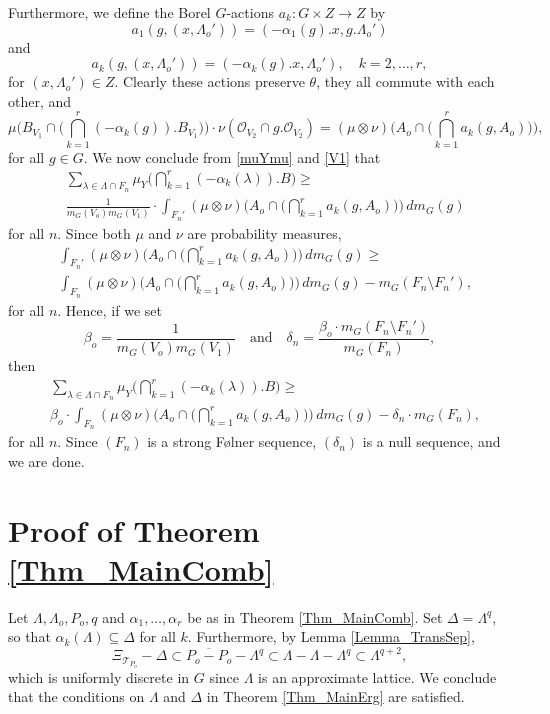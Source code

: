 \documentclass[12pt,reqno,a4paper]{amsart}
\numberwithin{equation}{section}
\newcommand{\cO}{\mathcal{O}}
\newcommand{\cT}{\mathcal{T}}
\newcommand{\ra}{\rightarrow}
\newcommand{\qand}{\quad \textrm{and} \quad}
\theoremstyle{theorem}
\theoremstyle{task}
\theoremstyle{definition}
\begin{document}
\noindent Furthermore, we define the Borel $G$-actions $a_k : G \times Z \ra Z$ by
\[
a_1(g,(x,\Lambda_o')) = (-\alpha_1(g).x,g.\Lambda_o') 
\]
and
\[
a_k(g,(x,\Lambda_o')) = (-\alpha_k(g).x,\Lambda_o'), \quad k = 2,\ldots,r,
\]
for $(x,\Lambda_o') \in Z$. 
Clearly these actions preserve $\theta$, they all commute with each other, and
\[
\mu\Big(B_{V_1} \cap \Big( \bigcap_{k=1}^r (-\alpha_k(g)).B_{V_1}\Big)\Big) \cdot \nu(\cO_{V_2} \cap g.\cO_{V_2})
= (\mu \otimes \nu)\Big( A_o \cap \Big( \bigcap_{k=1}^r a_k(g,A_o) \Big)\Big),
\]
for all $g \in G$. We now conclude from \eqref{muYmu} and \eqref{V1} that
\begin{align*}
&\sum_{\lambda \in \Lambda \cap F_n} \mu_Y\Big( \bigcap_{k=1}^r (-\alpha_k(\lambda)).B\Big)
\geq \\[0.2cm]
&\frac{1}{m_G(V_o)m_G(V_1)} \cdot \int_{F_n'} (\mu \otimes \nu)\Big( A_o \cap \Big( \bigcap_{k=1}^r a_k(g,A_o) \Big)\Big) \, dm_G(g)
\end{align*}
for all $n$. Since both $\mu$ and $\nu$ are probability measures, 
\begin{align*}
&\int_{F_n'} (\mu \otimes \nu)\Big( A_o \cap \Big( \bigcap_{k=1}^r a_k(g,A_o) \Big)\Big) \, dm_G(g)
\geq \\[0.2cm]
&\int_{F_n} (\mu \otimes \nu)\Big( A_o \cap \Big( \bigcap_{k=1}^r a_k(g,A_o) \Big)\Big) \, dm_G(g) - m_G(F_n \setminus F_n'),
\end{align*}
for all $n$. Hence, if we set
\[
\beta_o = \frac{1}{m_G(V_o)m_G(V_1)} \qand \delta_n = \frac{\beta_o \cdot m_G(F_n \setminus F_n')}{m_G(F_n)},
\]
then
\begin{align*}
&\sum_{\lambda \in \Lambda \cap F_n} \mu_Y\Big( \bigcap_{k=1}^r (-\alpha_k(\lambda)).B\Big) \geq \\[0.2cm]
&\beta_o \cdot \int_{F_n} (\mu \otimes \nu)\Big( A_o \cap \Big( \bigcap_{k=1}^r a_k(g,A_o) \Big)\Big) \, dm_G(g) - \delta_n \cdot m_G(F_n),
\end{align*}
for all $n$. Since $(F_n)$ is a strong F\o lner sequence, $(\delta_n)$ is a null sequence, and we are done.

\section{Proof of Theorem \ref{Thm_MainComb}}
\label{sec:prfcomb}
Let $\Lambda, \Lambda_o, P_o,q$ and $\alpha_1,\ldots,\alpha_r$ be as in Theorem \ref{Thm_MainComb}. Set $\Delta = \Lambda^q$, so that $\alpha_k(\Lambda) \subseteq \Delta$ for all $k$. Furthermore, by Lemma \ref{Lemma_TransSep}, 
\[
\Xi_{\cT_{P_o}} - \Delta \subset \overline{P_o - P_o} - \Lambda^q \subset \Lambda - \Lambda - \Lambda^q \subset \Lambda^{q+2},
\]
which is uniformly discrete in $G$ since $\Lambda$ is an approximate lattice. We conclude that the conditions on $\Lambda$ and $\Delta$ in Theorem \ref{Thm_MainErg} are satisfied. \\
\end{document}
